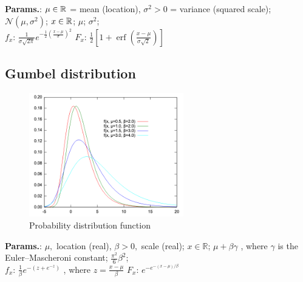     {\color{darkblue} \textbf{Params.}:} {$\mu\in\mathbb{R}$ = mean (location),  $\sigma^2>0$ = variance (squared scale)}; {$\mathcal{N}(\mu,\sigma^2)$}; {$x\in\mathbb{R}$}; {$\mu$}; {$\sigma^2$};\hspace{0.5cm}\\{\color{darkblue} \textbf{$f_x$}:} {$\frac{1}{\sigma\sqrt{2\pi}} e^{-\frac{1}{2}\left(\frac{x - \mu}{\sigma}\right)^2}$}{\color{darkblue} \textbf{$F_x$}:} {$\frac{1}{2}\left[1 + \operatorname{erf}\left( \frac{x-\mu}{\sigma\sqrt{2}}\right)\right] $}



    
        
\subsection{Gumbel distribution}


    \begin{figure}[H]
        \centering
        \includegraphics[width=0.6\textwidth]{images/Gumbel-Density.png}
        \caption{Probability distribution function}
    \end{figure}




    {\color{darkblue} \textbf{Params.}:} {$\mu,$ location (real),  $\beta>0,$ scale (real)}; {$x\in\mathbb{R}$}; {$\mu + \beta\gamma$ ,  where $\gamma$ is the Euler–Mascheroni constant}; {$\frac{\pi^2}{6}\beta^2$};\hspace{0.5cm}\\{\color{darkblue} \textbf{$f_x$}:} {$\frac{1}{\beta}e^{-(z+e^{-z})}$ ,  where $z=\frac{x-\mu}{\beta}$}{\color{darkblue} \textbf{$F_x$}:} {$e^{-e^{-(x-\mu)/\beta}}$}




